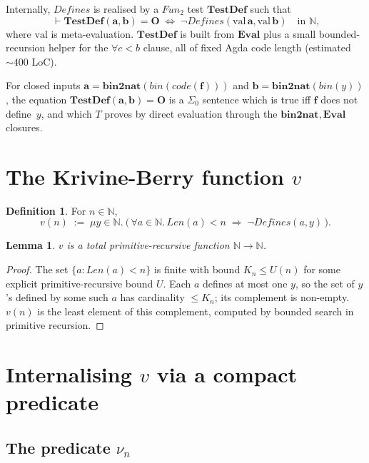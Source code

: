 \documentclass[11pt]{article}
\theoremstyle{plain}
\newtheorem{lemma}[theorem]{Lemma}
\theoremstyle{definition}
\newtheorem{definition}[theorem]{Definition}
\theoremstyle{remark}
\newcommand{\code}[1]{\mathit{code}(#1)}
\newcommand{\Fun}{\mathit{Fun}}
\newcommand{\Defines}{\mathit{Defines}}
\newcommand{\Len}{\mathit{Len}}
\newcommand{\Eval}{\mathbf{Eval}}
\newcommand{\bnt}{\mathbf{bin2nat}}
\newcommand{\bin}{\mathit{bin}}
\begin{document}
\noindent
Internally, $\Defines$ is realised by a $\Fun_2$ test
$\mathbf{TestDef}$ such that
$$
\vdash \mathbf{TestDef}(\mathbf{a}, \mathbf{b}) = \mathbf{O} \;\Longleftrightarrow\; \neg \Defines(\mathrm{val}\,\mathbf{a}, \mathrm{val}\,\mathbf{b})
\quad\text{in $\mathbb{N}$,}
$$
where $\mathrm{val}$ is meta-evaluation.  $\mathbf{TestDef}$ is built
from $\Eval$ plus a small bounded-recursion helper for the $\forall c
< b$ clause, all of fixed Agda code length (estimated $\sim 400$ LoC).

For closed inputs $\mathbf{a} = \bnt(\bin(\code{\mathbf{f}}))$ and
$\mathbf{b} = \bnt(\bin(y))$, the equation
$\mathbf{TestDef}(\mathbf{a}, \mathbf{b}) = \mathbf{O}$ is a $\Sigma_0$
sentence which is true iff $\mathbf{f}$ does not define~$y$, and which
$T$ proves by direct evaluation through the $\bnt, \Eval$ closures.

\section{The Krivine-Berry function $v$}

\begin{definition}\label{def:vfn}
For $n \in \mathbb{N}$,
$$
v(n) \;:=\; \mu y \in \mathbb{N}.\ \bigl(\,\forall a \in \mathbb{N}.\,\Len(a) < n \;\Rightarrow\; \neg \Defines(a, y)\,\bigr).
$$
\end{definition}

\begin{lemma}\label{lem:vtotal}
$v$ is a total primitive-recursive function $\mathbb{N} \to \mathbb{N}$.
\end{lemma}

\begin{proof}
The set $\{a : \Len(a) < n\}$ is finite with bound $K_n \leq U(n)$ for
some explicit primitive-recursive bound $U$.  Each $a$ defines at most
one $y$, so the set of $y$'s defined by some such $a$ has cardinality
$\leq K_n$; its complement is non-empty.  $v(n)$ is the least element
of this complement, computed by bounded search in primitive recursion.
\end{proof}

\section{Internalising $v$ via a compact predicate}

\subsection{The predicate $\nu_n$}
\end{document}

